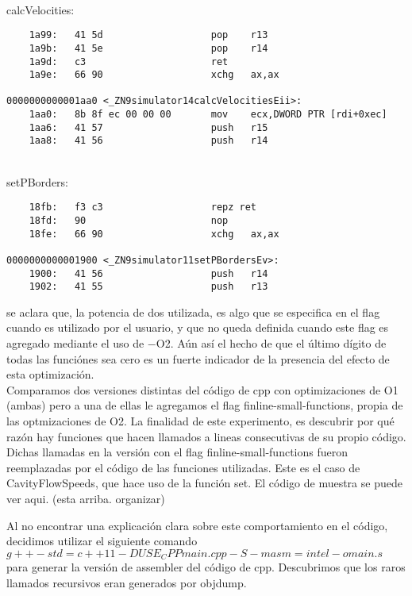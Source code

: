 ~\\
calcVelocities:
\begin{verbatim}
    1a99:   41 5d                   pop    r13
    1a9b:   41 5e                   pop    r14
    1a9d:   c3                      ret    
    1a9e:   66 90                   xchg   ax,ax

0000000000001aa0 <_ZN9simulator14calcVelocitiesEii>:
    1aa0:   8b 8f ec 00 00 00       mov    ecx,DWORD PTR [rdi+0xec]
    1aa6:   41 57                   push   r15
    1aa8:   41 56                   push   r14
\end{verbatim}
~\\
setPBorders:
\begin{verbatim}
    18fb:   f3 c3                   repz ret 
    18fd:   90                      nop
    18fe:   66 90                   xchg   ax,ax

0000000000001900 <_ZN9simulator11setPBordersEv>:
    1900:   41 56                   push   r14
    1902:   41 55                   push   r13
\end{verbatim}


se aclara que, la potencia de dos utilizada, es algo que se especifica en el flag cuando es utilizado por el usuario, y que no queda definida cuando este flag es agregado mediante el uso de $-$O2. Aún así el hecho de que el último dígito de todas las funciónes sea cero es un fuerte indicador de la presencia del efecto de esta optimización.\\



Comparamos dos versiones distintas del código de cpp con optimizaciones de O1 (ambas) pero a una de ellas le agregamos el flag finline-small-functions, propia de las optmizaciones de O2. La finalidad de este experimento, es descubrir por qué razón hay funciones que hacen llamados a lineas consecutivas de su propio código.\\
Dichas llamadas en la versión con el flag finline-small-functions fueron reemplazadas por el código de las funciones utilizadas. Este es el caso de CavityFlowSpeeds, que hace uso de la función set. El código de muestra se puede ver aqui. (esta arriba. organizar)

Al no encontrar una explicación clara sobre este comportamiento en el código, decidimos utilizar el siguiente comando $g++ -std=c++11 -DUSE_CPP main.cpp  -S -masm=intel -o main.s$ para generar la versión de assembler del código de cpp. Descubrimos que los raros llamados recursivos eran generados por objdump.



